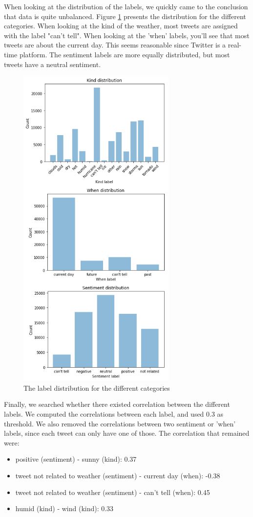\documentclass[11pt]{article}
\begin{document}
When looking at the distribution of the labels, we quickly came to the conclusion that data is quite unbalanced. Figure \ref{fig:dist} presents the distribution for the different categories. When looking at the kind of the weather, most tweets are assigned with the label "can't tell". When looking at the 'when' labels, you'll see that most tweets are about the current day. This seems reasonable since Twitter is a real-time platform. The sentiment labels are more equally distributed, but most tweets have a neutral sentiment.
\begin{figure}[]
    \centering
    \includegraphics{distributions.png}
    \caption{The label distribution for the different categories}
    \label{fig:dist}
\end{figure}

Finally, we searched whether there existed correlation between the different labels. We computed the correlations between each label, and used 0.3 as threshold. We also removed the correlations between two sentiment or 'when' labels, since each tweet can only have one of those. The correlation that remained were:
\begin{itemize}
    \item positive (sentiment) - sunny (kind): 0.37
    \item tweet not related to weather (sentiment) - current day (when): -0.38
    \item tweet not related to weather (sentiment) - can't tell (when): 0.45
    \item humid (kind) - wind (kind): 0.33
\end{itemize}
\end{document}
